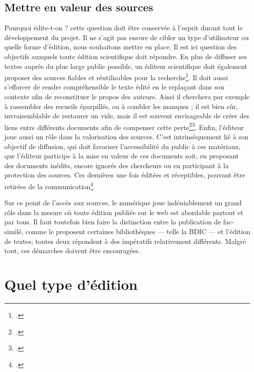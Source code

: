 \documentclass[12pt,a4paper]{book} %
\begin{document}
\subsection{Mettre en valeur des sources}
Pourquoi édite-t-on ? cette question doit être conservée à l'esprit durant tout le développement du projet.  Il ne s'agit pas encore de cibler un  type d'utilisateur ou quelle forme d'édition, nous souhaitons mettre en place.
Il est ici question des objectifs auxquels toute édition scientifique doit répondre. 
En plus de diffuser ses textes auprès du plus large public possible, un éditeur scientifique doit également proposer des sources fiables et réutilisables pour la recherche\footcite[p. 19]{nougaret_ledition_2015}. Il doit aussi s'efforcer de rendre compréhensible le texte édité en le replaçant dans son contexte afin de reconstituer le propos des auteurs. Ainsi il cherchera par exemple à rassembler des recueils éparpillés, ou à combler les manques ; il est bien sûr, invraisemblable de restaurer un vide, mais il est souvent envisageable de créer des liens entre différents documents afin de compenser cette perte\footcite{desenclos_early_2015}\footcite[p. 19]{nougaret_ledition_2015}. Enfin, l'éditeur joue aussi un rôle dans la valorisation des sources. C'est intrinsèquement lié à son objectif de diffusion, qui doit favoriser l'accessibilité du public à ces matériaux, que l'éditeur participe à la mise en valeur de ces documents soit, en proposant des documents inédits, encore ignorés des chercheurs ou en participant à la protection des sources. Ces dernières une fois éditées et réceptibles, pouvant être retirées de la communication\footcite{nougaret_ledition_2015}.

Sur ce point de l'accès aux sources, le numérique joue indéniablement un grand rôle dans la mesure où toute édition publiée sur le web est abordable partout et par tous. Il faut toutefois bien faire la distinction entre la publication de fac-similé, comme le proposent certaines bibliothèques --- telle la BDIC --- et l'édition de textes; toutes deux répondent à des impératifs relativement différents. Malgré tout, ces démarches doivent être encouragées.

\section{Quel type d'édition}
\end{document}

